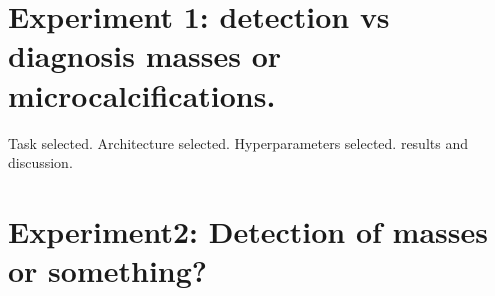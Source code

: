 \documentclass[11pt]{article}
\begin{document}
	\section{Experiment 1: detection vs diagnosis masses or microcalcifications.}
	Task selected. Architecture selected. Hyperparameters selected. results and discussion.

	\section{Experiment2: Detection of masses or something?}
	

	
	
	
\end{document}
